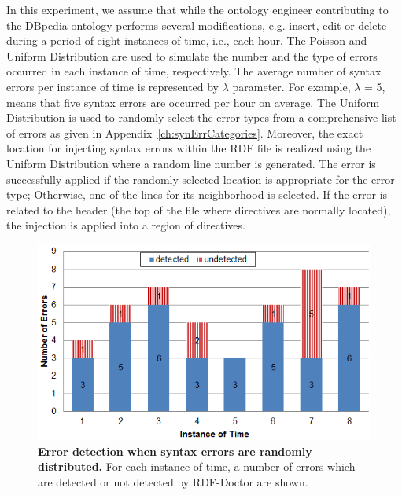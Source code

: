 In this experiment, we assume that while the ontology engineer contributing to the DBpedia ontology performs several modifications, e.g. insert, edit or delete during a period of eight instances of time, i.e., each hour. 
The Poisson and Uniform Distribution are used to simulate the number and the type of errors occurred in each instance of time, respectively.
The average number of syntax errors per instance of time is represented by $\lambda$ parameter. 
For example, $\lambda$ = 5, means that five syntax errors are occurred per hour on average.  
The Uniform Distribution is used to randomly select the error types from a comprehensive list of errors as given in Appendix~\ref{ch:synErrCategories}.
Moreover, the exact location for injecting syntax errors within the RDF file is realized using the Uniform Distribution where a random line number is generated.
The error is successfully applied if the randomly selected location is appropriate for the error type; Otherwise, one of the lines for its neighborhood is selected. 
If the error is related to the header (the top of the file where directives are normally located), the injection is applied into a region of directives.  

	\begin{figure}[ht]
	\begin{center}
		\includegraphics[scale=0.9,angle=0]{images/Experiment02-02.png}
				\vspace*{-4mm}
		\caption{\textbf{Error detection when syntax errors are randomly distributed.} 
		For each instance of time, a number of errors which are detected or not detected by RDF-Doctor are shown.
		} 
		\label{Fig:Experiment02-02}
	\end{center}
\end{figure}



